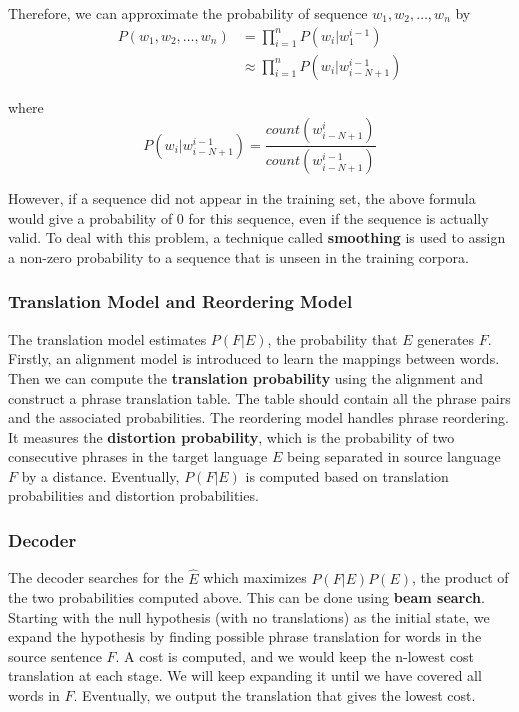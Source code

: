 \documentclass[12pt,a4paper,twoside,openright]{report}
\begin{document}
Therefore, we can approximate the probability of sequence $w_1, w_2, \dots, w_n$ by
\begin{equation*}
\begin{split}
P(w_1, w_2, \dots, w_n) & = \prod_{i=1}^{n}P(w_i|w_1^{i-1})\\
 & \approx \prod_{i=1}^{n}P(w_i|w_{i-N+1}^{i-1})
\end{split}
\end{equation*}

where
\begin{equation*}
P(w_i|w_{i-N+1}^{i-1}) = \frac{count(w_{i-N+1}^i)}{count(w_{i-N+1}^{i-1})}
\end{equation*}

However, if a sequence did not appear in the training set, the above formula would give a probability of 0 for this sequence, even if the sequence is actually valid. To deal with this problem, a technique called \textbf{smoothing} is used to assign a non-zero probability to a sequence that is unseen in the training corpora.

\subsubsection{Translation Model and Reordering Model}
The translation model estimates $P(F|E)$,  the probability that $E$ generates $F$. Firstly, an alignment model is introduced to learn the mappings between words. Then we can compute the \textbf{translation probability} using the alignment and construct a phrase translation table. The table should contain all the phrase pairs and the associated probabilities. The reordering model handles phrase reordering. It measures the \textbf{distortion probability}, which is the probability of two consecutive phrases in the target language $E$ being separated in source language $F$ by a distance. Eventually, $P(F|E)$ is computed based on translation probabilities and distortion probabilities.

\subsubsection{Decoder}
The decoder searches for the $\hat{E}$ which maximizes $P(F|E)P(E)$, the product of the two probabilities computed above. This can be done using \textbf{beam search}. Starting with the null hypothesis (with no translations) as the initial state, we expand the hypothesis by finding possible phrase translation for words in the source sentence $F$. A cost is computed, and we would keep the n-lowest cost translation at each stage. We will keep expanding it until we have covered all words in $F$. Eventually, we output the translation that gives the lowest cost.
\end{document}
